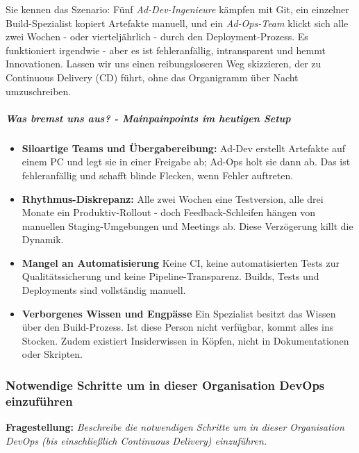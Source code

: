 Sie kennen das Szenario: Fünf \textit{Ad-Dev-Ingenieure} kämpfen mit Git, ein einzelner Build-Spezialist kopiert Artefakte manuell,
und ein \textit{Ad-Ops-Team} klickt sich alle zwei Wochen - oder vierteljährlich - durch den Deployment-Prozess.
Es funktioniert irgendwie - aber es ist fehleranfällig, intransparent und hemmt Innovationen.
Lassen wir uns einen reibungsloseren Weg skizzieren, der zu Continuous Delivery (CD) führt, ohne das Organigramm über Nacht umzuschreiben.

\subparagraph{Was bremst uns aus? - Mainpainpoints im heutigen Setup}

\begin{itemize}
    \item \textbf{Siloartige Teams und Übergabereibung:} Ad-Dev erstellt Artefakte auf einem PC und legt sie in einer Freigabe ab;
    Ad-Ops holt sie dann ab. Das ist fehleranfällig und schafft blinde Flecken, wenn Fehler auftreten.
    \item \textbf{Rhythmus-Diskrepanz:} Alle zwei Wochen eine Testversion, alle drei Monate ein Produktiv-Rollout -
    doch Feedback-Schleifen hängen von manuellen Staging-Umgebungen und Meetings ab.
    Diese Verzögerung killt die Dynamik.
    \item \textbf{Mangel an Automatisierung} Keine CI, keine automatisierten Tests zur Qualitätssicherung und keine Pipeline-Transparenz.
    Builds, Tests und Deployments sind vollständig manuell.
    \item \textbf{Verborgenes Wissen und Engpässe} Ein Spezialist besitzt das Wissen über den Build-Prozess.
    Ist diese Person nicht verfügbar, kommt alles ins Stocken. Zudem existiert Insiderwissen in Köpfen, nicht in Dokumentationen oder Skripten.
\end{itemize}


\subsubsection{Notwendige Schritte um in dieser Organisation DevOps einzuführen}

\textbf{Fragestellung:} \textit{Beschreibe die notwendigen Schritte um in dieser Organisation DevOps (bis einschließlich
Continuous Delivery) einzuführen.}

